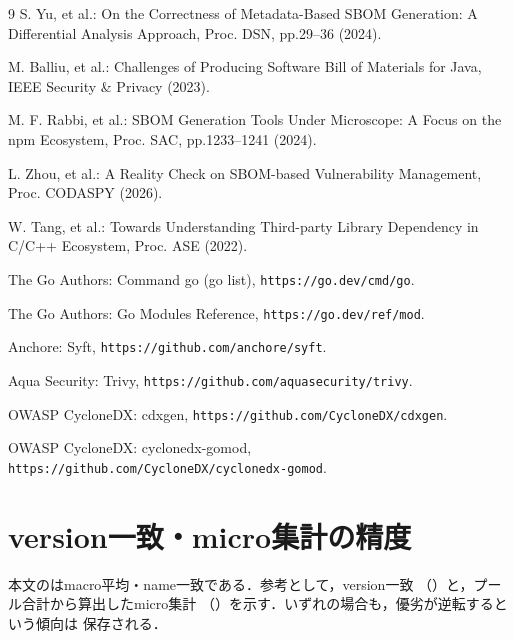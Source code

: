 \documentclass{css}
\def\|{\verb|}
\begin{document}
\begin{thebibliography}{9}
S. Yu, et al.:
On the Correctness of Metadata-Based SBOM Generation:
A Differential Analysis Approach,
Proc. DSN, pp.29--36 (2024).

M. Balliu, et al.:
Challenges of Producing Software Bill of Materials for Java,
IEEE Security \& Privacy (2023).

M. F. Rabbi, et al.:
SBOM Generation Tools Under Microscope:
A Focus on the npm Ecosystem,
Proc. SAC, pp.1233--1241 (2024).

L. Zhou, et al.:
A Reality Check on SBOM-based Vulnerability Management,
Proc. CODASPY (2026).

W. Tang, et al.:
Towards Understanding Third-party Library Dependency in
C/C++ Ecosystem,
Proc. ASE (2022).

The Go Authors:
Command go (go list),
\|https://go.dev/cmd/go|.

The Go Authors:
Go Modules Reference,
\|https://go.dev/ref/mod|.

Anchore: Syft, \|https://github.com/anchore/syft|.

Aqua Security: Trivy, \|https://github.com/aquasecurity/trivy|.

OWASP CycloneDX: cdxgen,
\|https://github.com/CycloneDX/cdxgen|.

OWASP CycloneDX: cyclonedx-gomod,
\|https://github.com/CycloneDX/cyclonedx-gomod|.
\end{thebibliography}

\appendix

\section{version一致・micro集計の精度}
本文のはmacro平均・name一致である．参考として，version一致
（）と，プール合計から算出したmicro集計
（）を示す．いずれの場合も，優劣が逆転するという傾向は
保存される．
\end{document}
